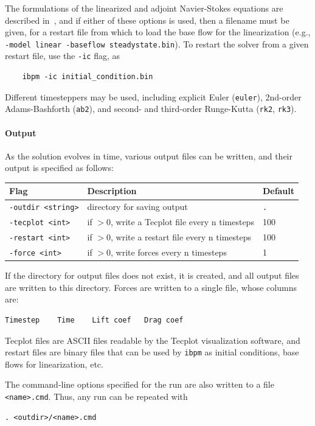 \documentclass[11pt]{article}
\begin{document}
The formulations of the linearized and adjoint Navier-Stokes equations are described in~\cite{AhuRow-08}, and if either of these options is used, then a filename must be given, for a restart file from which to load the base flow for the linearization (e.g., \verb|-model linear -baseflow steadystate.bin|).  To restart the solver from a given restart file, use the {\tt -ic} flag, as
\begin{Verbatim}
	ibpm -ic initial_condition.bin
\end{Verbatim}
Different timesteppers may be used, including explicit Euler ({\tt euler}), 2nd-order Adams-Bashforth ({\tt ab2}), and second- and third-order Runge-Kutta ({\tt rk2}, {\tt rk3}).

\paragraph{Output}
As the solution evolves in time, various output files can be written, and their output is specified as follows:

\begin{center}
\begin{tabular}{lll}
Flag & Description & Default\\
\hline
\verb|-outdir <string>| & directory for saving output & {\tt .}\\
\verb|-tecplot <int>|   & if $>0$, write a Tecplot file every n timesteps & 100\\
\verb|-restart <int>|   & if $>0$, write a restart file every n timesteps & 100\\
\verb|-force <int>|     & if $>0$, write forces every n timesteps & 1\\
\end{tabular}
\end{center}
If the directory for output files does not exist, it is created, and all output files are written to this directory.  Forces are written to a single file, whose columns are:
\begin{Verbatim}
Timestep	Time	Lift coef	Drag coef
\end{Verbatim}
Tecplot files are ASCII files readable by the Tecplot visualization software, and restart files are binary files that can be used by {\tt ibpm} as initial conditions, base flows for linearization, etc.

The command-line options specified for the run are also written to a file \verb|<name>.cmd|.  Thus, any run can be repeated with
\begin{Verbatim}
. <outdir>/<name>.cmd
\end{Verbatim}
\end{document}
